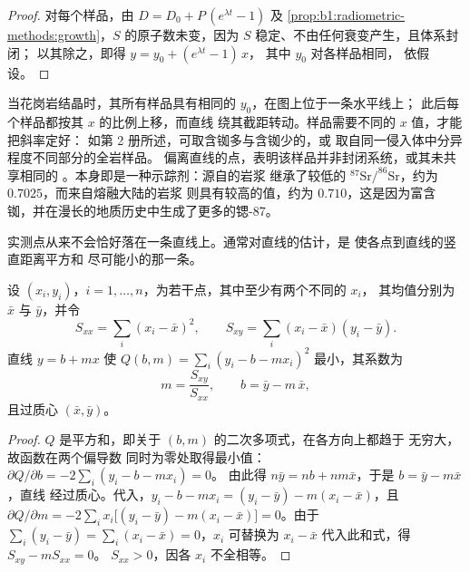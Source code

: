 \begin{proof}
对每个样品，由 $D = D_0 + P\,(e^{\lambda t} - 1)$ 及
\cref{prop:b1:radiometric-methods:growth}，$S$ 的原子数未变，因为 $S$ 稳定、不由任何衰变产生，且体系封闭；
以其除之，即得 $y = y_0 + (e^{\lambda t} - 1)\,x$，
其中 $y_0$ 对各样品相同，
依假设。
\end{proof}

当花岗岩结晶时，其所有样品具有相同的 $y_0$，在图上位于一条水平线上；
此后每个样品都按其 $x$ 的比例上移，而直线
绕其截距转动。样品需要不同的 $x$ 值，才能把斜率定好：
如第 2 册所述，可取含铷多与含铷少的，或
取自同一侵入体中分异程度不同部分的全岩样品。
偏离直线的点，表明该样品并非封闭系统，或其未共享相同的
。本身即是一种示踪剂：源自的岩浆
继承了较低的 $^{87}\mathrm{Sr}/^{86}\mathrm{Sr}$，约为 $0.7025$，而来自熔融大陆的岩浆
则具有较高的值，约为 $0.710$，这是因为富含
铷，并在漫长的地质历史中生成了更多的锶-87。

实测点从来不会恰好落在一条直线上。通常对直线的估计，是
使各点到直线的竖直距离平方和
尽可能小的那一条。

\begin{proposition}[最小二乘直线]\label{prop:b1:radiometric-methods:lsq}
设 $(x_i, y_i)$，$i = 1, \dots, n$，为若干点，其中至少有两个不同的 $x_i$，
其均值分别为 $\bar x$ 与 $\bar y$，并令
\[
  S_{xx} = \sum_i (x_i - \bar x)^2, \qquad S_{xy} = \sum_i (x_i - \bar x)(y_i - \bar y).
\]
直线 $y = b + m x$ 使 $Q(b, m) = \sum_i (y_i - b - m x_i)^2$ 最小，其系数为
\[
  m = \frac{S_{xy}}{S_{xx}}, \qquad b = \bar y - m\,\bar x ,
\]
且过质心 $(\bar x, \bar y)$。
\end{proposition}

\begin{proof}
$Q$ 是平方和，即关于 $(b, m)$ 的二次多项式，在各方向上都趋于
无穷大，故函数在两个偏导数
同时为零处取得最小值：$\partial Q/\partial b = -2 \sum_i (y_i - b - m x_i) = 0$。
由此得 $n\bar y = n b + n m \bar x$，于是 $b = \bar y - m \bar x$，直线
经过质心。代入，$y_i - b - m x_i = (y_i - \bar y) - m(x_i -
\bar x)$，且 $\partial Q/\partial m = -2 \sum_i x_i \bigl[(y_i - \bar y) - m(x_i
- \bar x)\bigr] = 0$。由于 $\sum_i (y_i - \bar y) = \sum_i (x_i - \bar x) = 0$，$x_i$
可替换为 $x_i - \bar x$ 代入此和式，得 $S_{xy} - m S_{xx} = 0$。
$S_{xx} > 0$，因各 $x_i$ 不全相等。
\end{proof}

